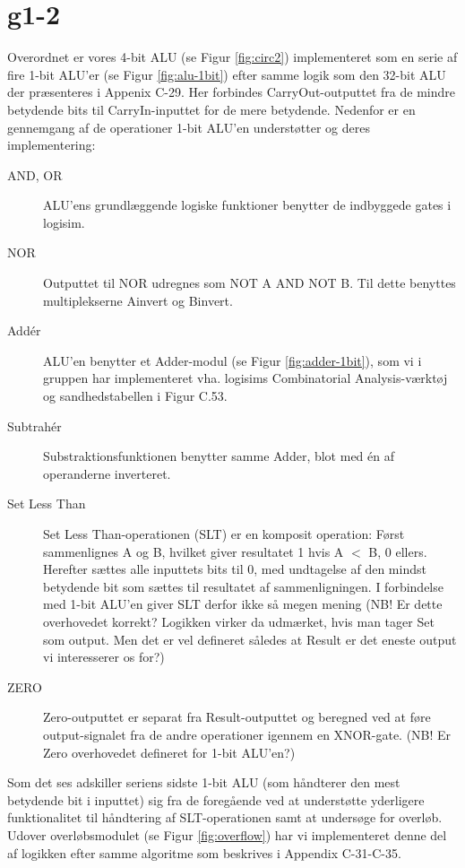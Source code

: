 \documentclass[10pt,a4paper,danish]{article}
\begin{document}
\section{g1-2} 
Overordnet er vores 4-bit ALU (se Figur \ref{fig:circ2}) implementeret som en serie af fire 1-bit ALU'er
(se Figur \ref{fig:alu-1bit}) efter samme logik som den 32-bit ALU der præsenteres i Appenix C-29. Her 
forbindes CarryOut-outputtet fra de mindre betydende bits til CarryIn-inputtet for de mere betydende. 
Nedenfor er en gennemgang af de operationer 1-bit ALU'en understøtter og deres implementering: 

\begin{description}
\item[AND, OR] ALU'ens grundlæggende logiske funktioner benytter de indbyggede gates i logisim.
\item[NOR] Outputtet til NOR udregnes som NOT A AND NOT B. Til dette benyttes multiplekserne 
           Ainvert og Binvert. 
\item[Addér] ALU'en benytter et Adder-modul (se Figur \ref{fig:adder-1bit}), som vi i gruppen har 
             implementeret vha. logisims Combinatorial Analysis-værktøj og sandhedstabellen i Figur C.53. 
\item[Subtrahér] Substraktionsfunktionen benytter samme Adder, blot med én af operanderne inverteret. 
\item[Set Less Than] Set Less Than-operationen (SLT) er en komposit operation: Først sammenlignes A og B, 
                     hvilket giver resultatet 1 hvis A $<$ B, 0 ellers. Herefter sættes alle inputtets bits
                     til 0, med undtagelse af den mindst betydende bit som sættes til resultatet af 
                     sammenligningen. I forbindelse med 1-bit ALU'en giver SLT derfor ikke så megen mening
                     (NB! Er dette overhovedet korrekt? Logikken virker da udmærket, hvis man tager Set
                     som output. Men det er vel defineret således at Result er det eneste output vi 
                     interesserer os for?)
\item[ZERO] Zero-outputtet er separat fra Result-outputtet og beregned ved at føre output-signalet fra 
            de andre operationer igennem en XNOR-gate. (NB! Er Zero overhovedet defineret for 1-bit ALU'en?)
\end{description}

Som det ses adskiller seriens sidste 1-bit ALU (som håndterer den mest betydende bit i inputtet) sig fra de
foregående ved at understøtte yderligere funktionalitet til håndtering af SLT-operationen samt at undersøge
for overløb. Udover overløbsmodulet (se Figur \ref{fig:overflow}) har vi implementeret denne del af logikken
efter samme algoritme som beskrives i Appendix C-31-C-35. 
\end{document}
